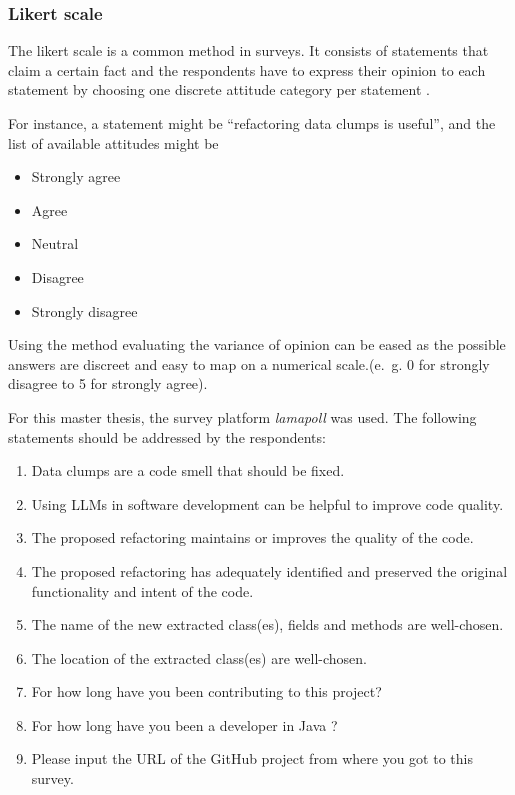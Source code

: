 \subsubsection{Likert scale}
The likert scale is a common method in surveys. It consists of statements that claim a certain fact and the respondents have to express their opinion to each statement by choosing one discrete attitude category per statement . \cite{edmondson2005likert}

For instance, a statement might be \enquote{refactoring data clumps is useful}, and the list of available attitudes might be
\begin{itemize}
    \item Strongly agree
    \item Agree
    \item Neutral
    \item Disagree
    \item Strongly disagree
\end{itemize}

Using the method evaluating the variance of opinion can be eased as the possible answers are discreet and easy to map on a numerical scale.(e.~g. 0 for strongly disagree to 5 for strongly agree).


For this master thesis, the survey platform \textit{lamapoll} \cite{lamapoll} was used.  The following statements should be addressed by the respondents:
\begin{enumerate}
\item Data clumps are a code smell that should be fixed.
\item Using LLMs in software development can be helpful to improve code quality.
\item The proposed refactoring maintains or improves the quality of the code.
\item The proposed refactoring has  adequately identified and preserved the original functionality and intent of the code.
\item The name of the new extracted class(es), fields and methods are well-chosen.
 \item The location of the extracted class(es) are well-chosen.
 \item For how long have you been contributing to this project?
\item For how long have you been a developer in Java ? 
\item Please input the URL of the GitHub project from where you got to this survey.

\end{enumerate}


